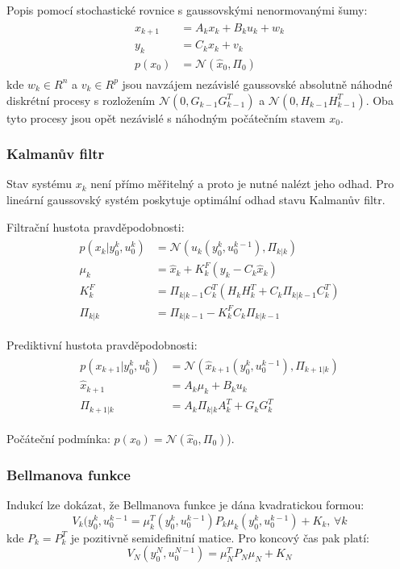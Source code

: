 Popis pomocí stochastické rovnice s gaussovskými nenormovanými šumy:
\begin{align*}
\begin{split}
x_{k+1} &= A_k x_k + B_k u_k + w_k \\
y_k &= C_k x_k + v_k \\
p(x_0) &= \mathscr{N}(\hat{x}_0, \Pi_0)
\end{split}
\end{align*}
kde $ w_k \in R^n $ a $ v_k \in R^p $ jsou navzájem nezávislé gaussovské absolutně náhodné diskrétní procesy s rozložením $ \mathscr{N}(0, G_{k-1}G_{k-1}^T) $ a $ \mathscr{N}(0, H_{k-1}H_{k-1}^T) $. Oba tyto procesy jsou opět nezávislé s náhodným počátečním stavem $ x_0 $.

\subsubsection*{Kalmanův filtr}
Stav systému $ x_k $ není přímo měřitelný a proto je nutné nalézt jeho odhad. Pro lineární gaussovský systém poskytuje optimální odhad stavu Kalmanův filtr.

Filtrační hustota pravděpodobnosti:
\begin{align*}
\begin{split}
p(x_k | y_0^k, u_0^k) &= \mathscr{N}(u_k(y_0^k, u_0^{k-1}), \Pi_{k|k}) \\
\mu_k &= \hat{x}_k + K_k^F(y_k-C_k\hat{x}_k) \\
K_k^F &= \Pi_{k|k-1}C_k^T(H_kH_k^T + C_k\Pi_{k|k-1}C_k^T) \\
\Pi_{k|k} &= \Pi_{k|k-1} - K_k^FC_k\Pi_{k|k-1}
\end{split}
\end{align*}

Prediktivní hustota pravděpodobnosti:
\begin{align*}
\begin{split}
p(x_{k+1} | y_0^k, u_0^k) &= \mathscr{N}(\hat{x}_{k+1}(y_0^k, u_0^{k-1}), \Pi_{k+1|k}) \\
\hat{x}_{k+1} &= A_k \mu_k + B_k u_k \\
\Pi_{k+1|k} &= A_k\Pi_{k|k}A_k^T + G_kG_k^T
\end{split}
\end{align*}

Počáteční podmínka: $ p(x_0) = \mathscr{N}(\hat{x}_0, \Pi_0) $).

\subsubsection*{Bellmanova funkce}
Indukcí lze dokázat, že Bellmanova funkce je dána kvadratickou formou:
\begin{equation*}
V_k(y_0^k, u_0^{k-1} = \mu_k^T(y_0^k, u_0^{k-1})P_k\mu_k(y_0^k,u_0^{k-1}) + K_k, \, \forall k
\end{equation*}
kde $ P_k = P_k^T $ je pozitivně semidefinitní matice. Pro koncový čas pak platí: 
\begin{equation*}
V_N(y_0^N, u_0^{N-1}) = \mu_N^TP_N\mu_N + K_N
\end{equation*}

